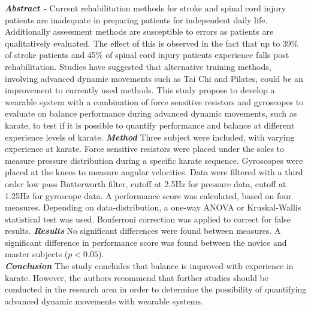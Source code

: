 \textbf{\textit{Abstract -}} Current rehabilitation methods for stroke and spinal cord injury patients are inadequate in preparing patients for independent daily life. Additionally assessment methods are susceptible to errors as patients are qualitatively evaluated. The effect of this is observed in the fact that up to 39\% of stroke patients and 45\% of spinal cord injury patients experience falls post rehabilitation. Studies have suggested that alternative training methods, involving advanced dynamic movements such as Tai Chi and Pilates, could be an improvement to currently used methods. This study propose to develop a wearable system with a combination of force sensitive resistors and gyroscopes to evaluate on balance performance during advanced dynamic movements, such as karate, to test if it is possible to quantify performance and balance at different experience levels of karate. \textbf{\textit{Method}} Three subject were included, with varying experience at karate. Force sensitive resistors were placed under the soles to measure pressure distribution during a specific karate sequence. Gyroscopes were placed at the knees to measure angular velocities. Data were filtered with a third order low pass Butterworth filter, cutoff at 2.5Hz for pressure data, cutoff at 1.25Hz for gyroscope data. A performance score was calculated, based on four measures. Depending on data-distribution, a one-way ANOVA or Kruskal-Wallis statistical test was used. Bonferroni correction was applied to correct for false results. \textbf{\textit{Results}} No significant differences were found between measures. A significant difference in performance score was found between the novice and master subjects ($p<0.05$).\\ \textbf{\textit{Conclusion}} The study concludes that balance is improved with experience in karate. However, the authors recommend that further studies should be conducted in the research area in order to determine the possibility of quantifying advanced dynamic movements with wearable systems.
